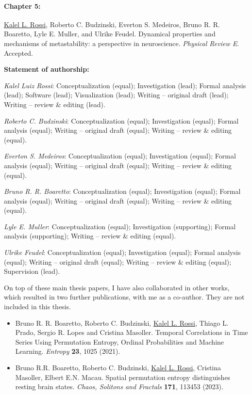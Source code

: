 \paragraph{Chapter 5:}
\underline{Kalel L. Rossi}, Roberto C. Budzinski, Everton S. Medeiros, Bruno R. R. Boaretto, Lyle E. Muller, and Ulrike Feudel. Dynamical properties and mechanisms of metastability: a perspective in neuroscience. \textit{Physical Review E}. Accepted.

{\vspace{0.3cm}\footnotesize \textbf{Statement of authorship:} %

\textit{Kalel Luiz Rossi}: Conceptualization (equal); Investigation (lead); Formal analysis (lead); Software (lead); Visualization (lead); Writing – original draft (lead); Writing – review \& editing (lead). 

\textit{Roberto C. Budzinski}: Conceptualization (equal); Investigation (equal); Formal analysis (equal); Writing – original draft (equal); Writing – review \& editing (equal).

\textit{Everton S. Medeiros}: Conceptualization (equal); Investigation (equal); Formal analysis (equal); Writing – original draft (equal); Writing – review \& editing (equal).

\textit{Bruno R. R. Boaretto}: Conceptualization (equal); Investigation (equal); Formal analysis (equal); Writing – original draft (equal); Writing – review \& editing (equal).

\textit{Lyle E. Muller}: Conceptualization (equal); Investigation (supporting); Formal analysis (supporting);  Writing – review \& editing (equal).

\textit{Ulrike Feudel}: Conceptualization (equal); Investigation (equal); Formal analysis (equal); Writing – original draft (equal); Writing – review \& editing (equal); Supervision (lead).
}

\vspace{1cm}


On top of these main thesis papers, I have also collaborated in other works, which resulted in two further publications, with me as a co-author. They are not included in this thesis.
\begin{itemize}
    \item Bruno R. R. Boaretto, Roberto C. Budzinski, \underline{Kalel L. Rossi}, Thiago L. Prado, Sergio R. Lopes and Cristina Masoller. Temporal Correlations in Time Series Using Permutation Entropy, Ordinal Probabilities and Machine Learning. \textit{Entropy} \textbf{23}, 1025 (2021).
    \item Bruno R.R. Boaretto, Roberto C. Budzinski, \underline{Kalel L. Rossi}, Cristina Masoller, Elbert E.N. Macau. Spatial permutation entropy distinguishes resting brain states. \textit{Chaos, Solitons and Fractals} \textbf{171}, 113453 (2023).
\end{itemize}
